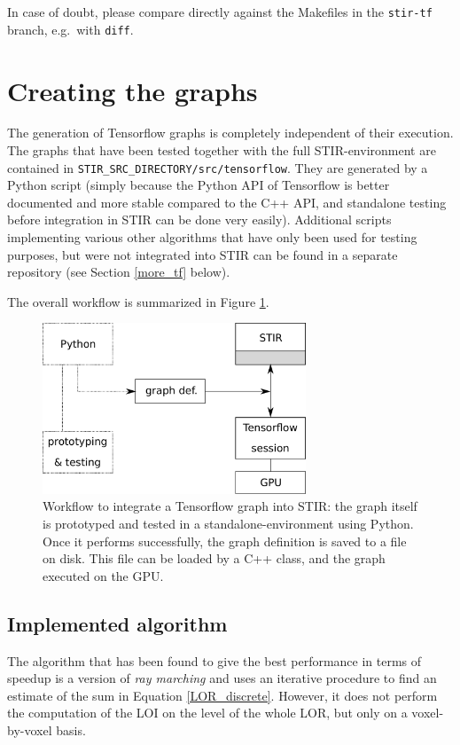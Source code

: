 \documentclass[a4paper, 11pt]{article}
\begin{document}
  In case of doubt, please compare directly against the Makefiles in the \texttt{stir-tf} branch, e.g.~with \texttt{diff}.
  
  \section{Creating the graphs}
  The generation of Tensorflow graphs is completely independent of their execution. The graphs that have been tested together with the full STIR-environment are contained in \texttt{STIR\_SRC\_DIRECTORY\-/src/tensorflow}. They are generated by a Python script (simply because the Python API of Tensorflow is better documented and more stable compared to the C++ API, and standalone testing before integration in STIR can be done very easily). Additional scripts implementing various other algorithms that have only been used for testing purposes, but were not integrated into STIR can be found in a separate repository (see Section \ref{more_tf} below).

  The overall workflow is summarized in Figure \ref{workflow-global}.

  \begin{figure}
    \centering
    \includegraphics[width = 0.7\textwidth]{../global_workflow.pdf}
    \caption{Workflow to integrate a Tensorflow graph into STIR: the graph itself is prototyped and tested in a standalone-environment using Python. Once it performs successfully, the graph definition is saved to a file on disk. This file can be loaded by a C++ class, and the graph executed on the GPU.}
    \label{workflow-global}
  \end{figure}

  \subsection{Implemented algorithm}
  \label{raymarching}
  The algorithm that has been found to give the best performance in terms of speedup is a version of \textsl{ray marching} and uses an iterative procedure to find an estimate of the sum in Equation \ref{LOR_discrete}. However, it does not perform the computation of the LOI on the level of the whole LOR, but only on a voxel-by-voxel basis. 
\end{document}
